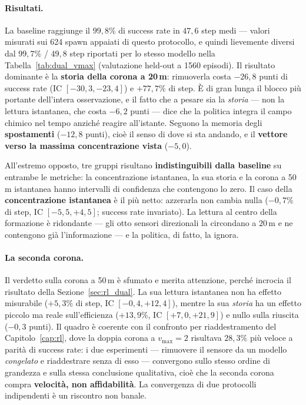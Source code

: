 \paragraph{Risultati.} La baseline raggiunge il $99{,}8\%$ di success rate in $47{,}6$
step medi --- valori misurati sui 624 spawn appaiati di questo protocollo, e quindi
lievemente diversi dal $99{,}7\%$ / $49{,}8$ step riportati per lo stesso modello nella
Tabella~\ref{tab:dual_vmax} (valutazione held-out a 1560 episodi). Il risultato dominante \`e la \textbf{storia della corona a 20\,m}: rimuoverla
costa $-26{,}8$ punti di success rate (IC $[-30{,}3, -23{,}4]$) e $+77{,}7\%$ di step. \`E
di gran lunga il blocco pi\`u portante dell'intera osservazione, e il fatto che a pesare
sia la \emph{storia} --- non la lettura istantanea, che costa $-6{,}2$ punti --- dice che
la politica integra il campo chimico nel tempo anzich\'e reagire all'istante. Seguono la
memoria degli \textbf{spostamenti} ($-12{,}8$ punti), cio\`e il senso di dove si sta
andando, e il \textbf{vettore verso la massima concentrazione vista} ($-5{,}0$).

All'estremo opposto, tre gruppi risultano \textbf{indistinguibili dalla baseline} su
entrambe le metriche: la concentrazione istantanea, la sua storia e la corona a 50\,m
istantanea hanno intervalli di confidenza che contengono lo zero. Il caso della
\textbf{concentrazione istantanea} \`e il pi\`u netto: azzerarla non cambia nulla
($-0{,}7\%$ di step, IC $[-5{,}5, +4{,}5]$; success rate invariato). La lettura al centro
della formazione \`e ridondante --- gli otto sensori direzionali la circondano a
$20\,\text{m}$ e ne contengono gi\`a l'informazione --- e la politica, di fatto, la
ignora.

\paragraph{La seconda corona.} Il verdetto sulla corona a 50\,m \`e sfumato e merita
attenzione, perch\'e incrocia il risultato della Sezione~\ref{sec:rl_dual}. La sua lettura
istantanea non ha effetto misurabile ($+5{,}3\%$ di step, IC $[-0{,}4, +12{,}4]$), mentre
la sua \emph{storia} ha un effetto piccolo ma reale sull'efficienza ($+13{,}9\%$, IC
$[+7{,}0, +21{,}9]$) e nullo sulla riuscita ($-0{,}3$ punti). Il quadro \`e coerente con
il confronto per riaddestramento del Capitolo~\ref{cap:rl}, dove la doppia corona a
$v_{\max}{=}2$ risultava $28{,}3\%$ pi\`u veloce a parit\`a di success rate: i due
esperimenti --- rimuovere il sensore da un modello \emph{congelato} e riaddestrare senza
di esso --- convergono sullo stesso ordine di grandezza e sulla stessa conclusione
qualitativa, cio\`e che la seconda corona compra \textbf{velocit\`a, non affidabilit\`a}.
La convergenza di due protocolli indipendenti \`e un riscontro non banale.

